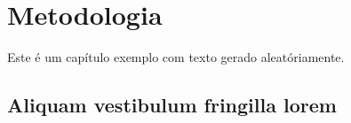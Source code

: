 \chapter{Metodologia}
Este é um capítulo exemplo com texto gerado aleatóriamente.
\section{Aliquam vestibulum fringilla lorem}

\lipsum[1]

\lipsum[2-3]
